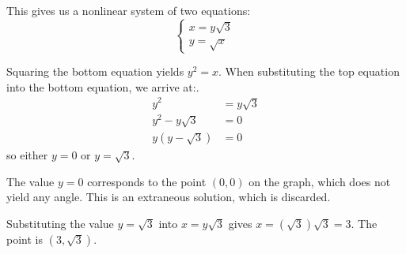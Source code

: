 \documentclass[nooutcomes]{ximera}
\begin{document}
\begin{example}
\begin{explanation}
		This gives us a nonlinear system of two equations:
		\[ \begin{cases} x = y\sqrt{3} \\ y = \sqrt{x} \end{cases}\]

		Squaring the bottom equation yields $y^2 = x$. When substituting the top equation into the bottom equation, we arrive at:.
		\begin{align*}
			y^2 &= y\sqrt{3}\\
			y^2 - y\sqrt{3} &= 0\\
			y(y - \sqrt{3}) &= 0
		\end{align*}
		so either $y=0$ or $y=\sqrt{3}$.
		
		The value $y=0$ corresponds to the point $(0,0)$ on the graph, which does not yield any angle. This is an extraneous solution, which is discarded.
		
		Substituting the value $y=\sqrt{3}$ into $x = y\sqrt{3}$ gives $x = (\sqrt{3})\sqrt{3} = 3$. The point is $\left( 3, \sqrt{3}\right)$.

	\end{explanation}
\end{example}
\end{document}

